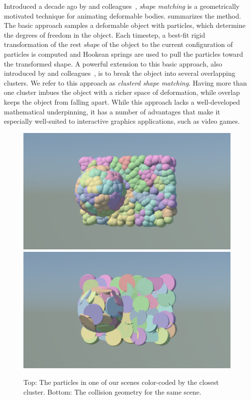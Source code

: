 \documentclass[review]{acmsiggraph}
\begin{document}
Introduced a decade ago by \Mueller and
colleagues~, 
{\em shape matching} is a
geometrically motivated technique for animating deformable bodies.
 summarizes the method.
The basic approach samples a deformable object with particles, which
determine the degrees of freedom in the object.  Each timestep, a best-fit
rigid transformation of the rest {\em shape} of the object to the 
current configuration of particles is computed and Hookean springs
are used to pull the particles toward the transformed shape.
A powerful extension to this basic approach, also introduced by 
\Mueller and colleagues~, is to break the
object into several overlapping clusters.  We refer to this approach as
{\em clusterd shape matching}.  Having more than one cluster imbues
the object with a richer space of deformation, while overlap keeps
the object from falling apart.
While this approach lacks a well-developed mathematical
underpinning, it has a number of advantages that make it especially
well-suited to interactive graphics applications, such as video games.

\begin{figure}[t!]
\includegraphics[width=\linewidth]{Figures/clusterparticles.png}
\includegraphics[width=\linewidth]{Figures/clustercollision.png}
\caption{Top: The particles in one of our scenes color-coded by the closest cluster.
Bottom: The collision geometry for the same scene.}
\end{figure}
\end{document}
